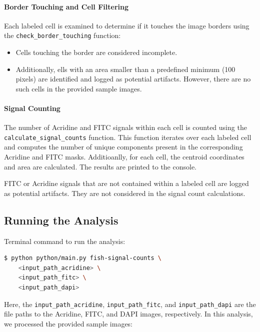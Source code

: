 \documentclass[a4paper,12pt]{article}
\begin{document}
\paragraph{Border Touching and Cell Filtering}

Each labeled cell is examined to determine if it touches the image borders using the \texttt{check\_border\_touching} function:
\begin{itemize}
    \item Cells touching the border are considered incomplete.
    \item Additionally, ells with an area smaller than a predefined minimum (100 pixels) are identified and logged as potential artifacts. However, there are no such cells in the provided sample images.
\end{itemize}

\paragraph{Signal Counting}

The number of Acridine and FITC signals within each cell is counted using the \texttt{calculate\_signal\_counts} function. This function iterates over each labeled cell and computes the number of unique components present in the corresponding Acridine and FITC masks. Additioanlly, for each cell, the centroid coordinates and area are calculated. The results are printed to the console.

FITC or Acridine signals that are not contained within a labeled cell are logged as potential artifacts. They are not considered in the signal count calculations.

\subsection{Running the Analysis}

Terminal command to run the analysis:

\begin{lstlisting}[language=bash]
$ python python/main.py fish-signal-counts \
    <input_path_acridine> \
    <input_path_fitc> \
    <input_path_dapi>
\end{lstlisting}

Here, the \texttt{input\_path\_acridine}, \texttt{input\_path\_fitc}, and \texttt{input\_path\_dapi} are the file paths to the Acridine, FITC, and DAPI images, respectively. In this analysis, we processed the provided sample images:
\end{document}
